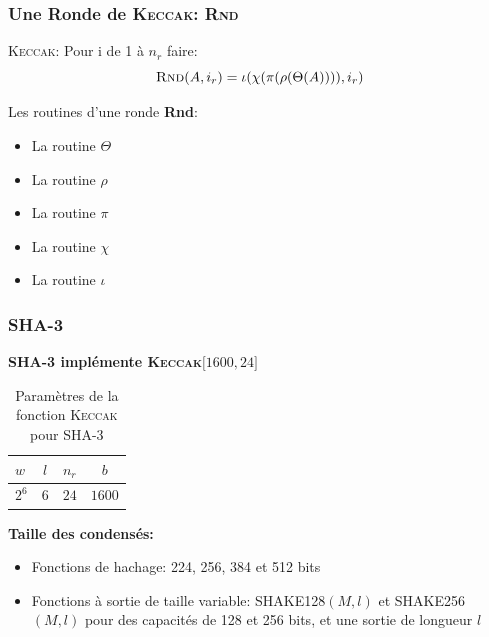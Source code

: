 \begin{frame}
  \frametitle{Une Ronde de \textsc{Keccak}: \textsc{Rnd}}
  \vfill
  \textsc{Keccak}: Pour i de 1 à $n_r$ faire: 
$$\textsc{Rnd}(A,i_r)=\iota ( \chi ( \pi ( \rho (\Theta (A)))), i_r)$$

  \vfill

Les routines d'une ronde \textbf{Rnd}:
  \begin{itemize}
  \item{La routine $\Theta$}
  \item{La routine $\rho$}
  \item{La routine $\pi$}
  \item{La routine $\chi$}
  \item{La routine $\iota$}
   \end{itemize}
  \vfill
\end{frame}


\begin{frame}
  \frametitle{SHA-3}

\vfill
   
\centerline{\textbf{SHA-3 implémente \textsc{Keccak}$\lbrack 1600, 24 \rbrack$}}
 
\bgroup
\def\arraystretch{1.5}
  \begin{table}
\begin{tabular}{l | c | c | c }
$w$ & $l$ & $n_r$ & $b$ \\
\hline
$2^6$ & $6$ & $24$ & $1600 $ 
\end{tabular}
\caption{Paramètres de la fonction \textsc{Keccak} pour SHA-3}

\end{table}

\egroup

\vfill

\textbf{Taille des condensés:}
\begin{itemize}
\item{Fonctions de hachage: 224, 256, 384 et 512 bits}
\item{Fonctions à sortie de taille variable: \textsc{SHAKE128}$(M,l)$ et \textsc{SHAKE256}$(M,l)$  pour des capacités de 128 et 256 bits, et une sortie de longueur $l$ }
\end{itemize}
\vspace{1cm}
\vfill
\end{frame}
